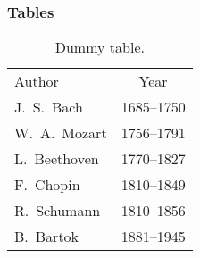 \begin{frame}
	\frametitle{Tables}%
    \begin{table}[t]
        \caption{Dummy table.}
        \label{tab:example}  
        \begin{tabular}{lc}
            \rowcolor{colorfamA!35!white}
            Author & Year\\
            J.\ S.\ Bach
            & 1685--1750 \\
            W.\ A.\ Mozart & 1756--1791 \\
            L.\ Beethoven & 1770--1827 \\
            F.\ Chopin
            & 1810--1849 \\
            R.\ Schumann
            & 1810--1856 \\
            B.\ Bartok & 1881--1945 \\
        \end{tabular}
    \end{table}
\end{frame}
